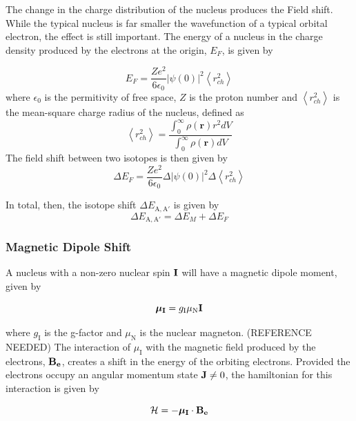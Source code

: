\documentclass[12pt,a4paper,margin=1in]{book}
\begin{document}
The change in the charge distribution of the nucleus produces the Field shift. While the typical nucleus is far smaller the wavefunction of a typical orbital electron, the effect is still important. The energy of a nucleus in the charge density produced by the electrons at the origin, $E_F$, is given by

\begin{equation}
E_F = \frac{Ze^2}{6 \epsilon_0}|\psi(0)|^2 \left\langle r_{ch}^2\right\rangle
\end{equation}
where $\epsilon_0$ is the permitivity of free space, $Z$ is the proton number and $ \left\langle r_{ch}^2\right\rangle$ is the mean-square charge radius of the nucleus, defined as
\begin{equation}
 \left\langle r_{ch}^2\right\rangle = \frac{\int_0^{\infty}\rho(\mathbf{r})r^2dV}{\int_0^{\infty}\rho(\mathbf{r})dV}
\end{equation}
The field shift between two isotopes is then given by
\begin{equation}
\Delta E_F =  \frac{Ze^2}{6 \epsilon_0}\Delta|\psi(0)|^2 \Delta\left\langle r_{ch}^2\right\rangle
\end{equation}

In total, then, the isotope shift $\Delta E_{\mathrm{A,A}'}$ is given by
\begin{equation}
 \Delta E_{\mathrm{A,A'}} = \Delta E_M + \Delta E_F
\end{equation}
\subsubsection*{Magnetic Dipole Shift}
A nucleus with a non-zero nuclear spin $\bf{I}$  will have a magnetic dipole moment, given by

\begin{equation}
\boldsymbol{\mu}_{\mathrm{\bf{I}}} = g_{\mathrm{I}}\mu_{\mathrm{N}}\mathrm{\bf{I}}
\end{equation}

where $g_{\mathrm{I}}$ is the g-factor and $\mu_{\mathrm{N}}$ is the nuclear magneton. (REFERENCE NEEDED) The interaction of $\mu_{\mathrm{I}}$ with the magnetic field produced by the electrons, $\mathrm{\bf{B_e}}$, creates a shift in the energy of the orbiting electrons. Provided the electrons occupy an angular momentum state $\mathrm{\bf{J}} \neq 0$, the hamiltonian for this interaction is given by

\begin{equation}
\mathcal{H} = -\boldsymbol{\mu}_{\mathrm{\bf{I}}} \cdot \mathrm{\bf{B_e}}
\end{equation}
\end{document}
